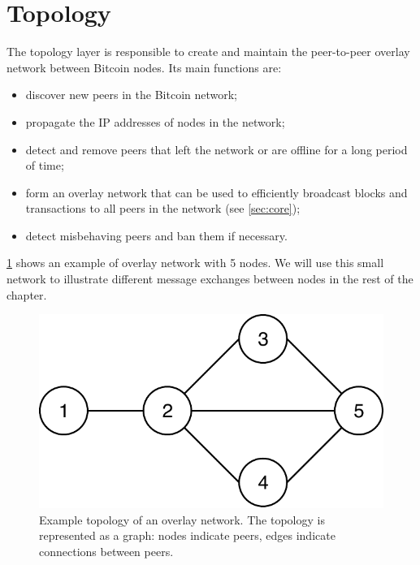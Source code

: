 \section{Topology}
\label{sec:topology}
The topology layer is responsible to create and maintain the peer-to-peer overlay network between Bitcoin nodes.
Its main functions are:
\begin{itemize}
	\item discover new peers in the Bitcoin network;
	\item propagate the IP addresses of nodes in the network;
	\item detect and remove peers that left the network or are offline for a long period of time;
	\item form an overlay network that can be used to efficiently broadcast blocks and transactions to all peers in the network (see \cref{sec:core});
	\item detect misbehaving peers and ban them if necessary.
\end{itemize}
\cref{fig:topology} shows an example of overlay network with \num{5} nodes.
We will use this small network to illustrate different message exchanges between nodes in the rest of the chapter.

\begin{figure}[t]
	\centering
	\vspace*{0.25cm}
	\includegraphics[scale=0.65]{figures/network}
	\vspace*{0.25cm}
	\caption[Example topology of an overlay network]{
		Example topology of an overlay network.
		The topology is represented as a graph:
		nodes indicate peers, edges indicate connections between peers.
	}
	\label{fig:topology}
\end{figure}


